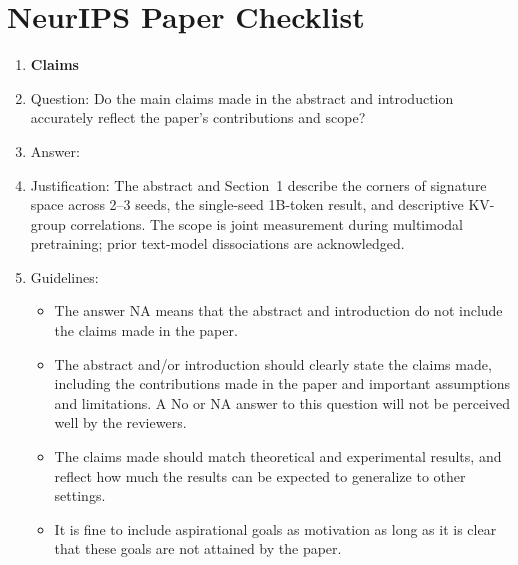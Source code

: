 \section*{NeurIPS Paper Checklist}

\begin{enumerate}

\item {\bf Claims}
    \item[] Question: Do the main claims made in the abstract and introduction accurately reflect the paper's contributions and scope?
    \item[] Answer: \answerYes{}
    \item[] Justification: The abstract and Section~1 describe the corners of signature space across 2--3 seeds, the single-seed 1B-token result, and descriptive KV-group correlations. The scope is joint measurement during multimodal pretraining; prior text-model dissociations are acknowledged.
    \item[] Guidelines:
    \begin{itemize}
        \item The answer NA means that the abstract and introduction do not include the claims made in the paper.
        \item The abstract and/or introduction should clearly state the claims made, including the contributions made in the paper and important assumptions and limitations. A No or NA answer to this question will not be perceived well by the reviewers.
        \item The claims made should match theoretical and experimental results, and reflect how much the results can be expected to generalize to other settings.
        \item It is fine to include aspirational goals as motivation as long as it is clear that these goals are not attained by the paper.
    \end{itemize}


\end{enumerate}
